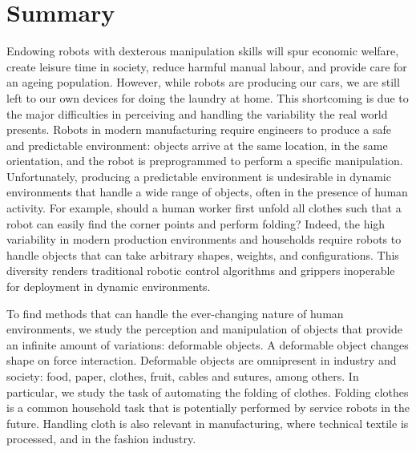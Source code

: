 \documentclass[\home/main.tex]{subfiles}
\begin{document}

\chapter{Summary}

Endowing robots with dexterous manipulation skills will spur economic welfare, create leisure time in society, reduce harmful manual labour, and provide care for an ageing population.
However, while robots are producing our cars, we are still left to our own devices for doing the laundry at home. This shortcoming is due to the major difficulties in perceiving and handling the variability the real world presents.
Robots in modern manufacturing require engineers to produce a safe and predictable environment: objects arrive at the same location, in the same orientation, and the robot is preprogrammed to perform a specific manipulation.
Unfortunately, producing a predictable environment is undesirable in dynamic environments that handle a wide range of objects, often in the presence of human activity. For example, should a human worker first unfold all clothes such that a robot can easily find the corner points and perform folding?
Indeed, the high variability in modern production environments and households require robots to handle objects that can take arbitrary shapes, weights, and configurations. This diversity renders traditional robotic control algorithms and grippers inoperable for deployment in dynamic environments.

To find methods that can handle the ever-changing nature of human environments, we study the perception and manipulation of objects that provide an infinite amount of variations: deformable objects. A deformable object changes shape on force interaction. Deformable objects are omnipresent in industry and society: food, paper, clothes, fruit, cables and sutures, among others. In particular, we study the task of automating the folding of clothes. Folding clothes is a common household task that is potentially performed by service robots in the future. Handling cloth is also relevant in manufacturing, where technical textile is processed, and in the fashion industry.
\end{document}
